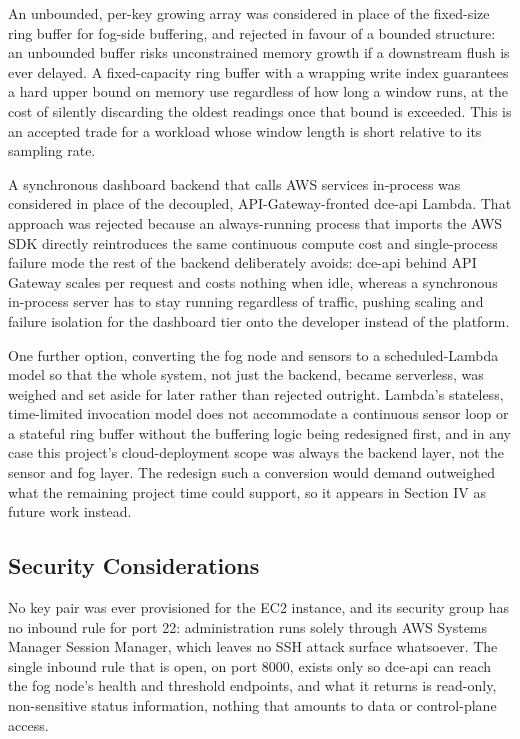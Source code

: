 \documentclass[conference]{IEEEtran}
\begin{document}
An unbounded, per-key growing array was considered in place of the fixed-size ring buffer for fog-side buffering, and rejected in favour of a bounded structure: an unbounded buffer risks unconstrained memory growth if a downstream flush is ever delayed. A fixed-capacity ring buffer with a wrapping write index guarantees a hard upper bound on memory use regardless of how long a window runs, at the cost of silently discarding the oldest readings once that bound is exceeded. This is an accepted trade for a workload whose window length is short relative to its sampling rate.

A synchronous dashboard backend that calls AWS services in-process was considered in place of the decoupled, API-Gateway-fronted dce-api Lambda. That approach was rejected because an always-running process that imports the AWS SDK directly reintroduces the same continuous compute cost and single-process failure mode the rest of the backend deliberately avoids: dce-api behind API Gateway scales per request and costs nothing when idle, whereas a synchronous in-process server has to stay running regardless of traffic, pushing scaling and failure isolation for the dashboard tier onto the developer instead of the platform.

One further option, converting the fog node and sensors to a scheduled-Lambda model so that the whole system, not just the backend, became serverless, was weighed and set aside for later rather than rejected outright. Lambda's stateless, time-limited invocation model does not accommodate a continuous sensor loop or a stateful ring buffer without the buffering logic being redesigned first, and in any case this project's cloud-deployment scope was always the backend layer, not the sensor and fog layer. The redesign such a conversion would demand outweighed what the remaining project time could support, so it appears in Section IV as future work instead.

\subsection{Security Considerations}
No key pair was ever provisioned for the EC2 instance, and its security group has no inbound rule for port 22: administration runs solely through AWS Systems Manager Session Manager, which leaves no SSH attack surface whatsoever. The single inbound rule that is open, on port 8000, exists only so dce-api can reach the fog node's health and threshold endpoints, and what it returns is read-only, non-sensitive status information, nothing that amounts to data or control-plane access.
\end{document}

